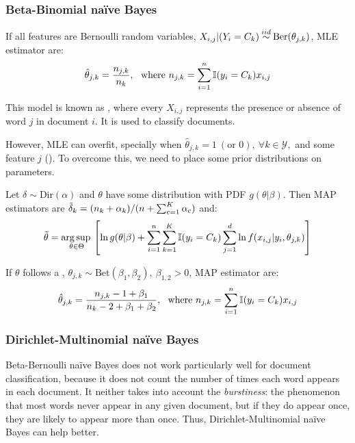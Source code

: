 \subsubsection*{Beta-Binomial naïve Bayes}
If all features are Bernoulli random variables, $X_{i,j}|(Y_i=C_k)\dist{iid}\text{Ber}(\theta_{j,k})$, MLE estimator are:
\begin{equation*}
    \hat{\theta}_{j,k} = \frac{n_{j,k}}{n_k},\ \text{ where } n_{j,k}=\sum_{i=1}^n\operatorname{\mathbb{I}}(y_i=C_k)x_{i,j}
\end{equation*}

This model is known as , where every $X_{i,j}$ represents the presence or absence of word $j$ in document $i$. It is used to classify documents. 

However, MLE can overfit, specially when $\hat{\theta}_{j,k}=1\ (\text{or } 0),\ \forall k\in\mathcal{Y},$ and some feature $j$ (). To overcome this, we need to place some prior distributions on parameters. 

Let $\delta\sim\text{Dir}(\alpha)$ and $\theta$ have some distribution with PDF $g(\theta|\beta)$. Then MAP estimators are $\Tilde{\delta}_k = (n_k+\alpha_k)/(n+\sum_{c=1}^K\alpha_c)$ and:
\begin{equation*}
    \Tilde{\theta} = \operatorname*{arg\,sup\,}_{\theta\in\Theta} \left[\ln g(\theta|\beta)+ \sum_{i=1}^n\sum_{k=1}^K\operatorname{\mathbb{I}}(y_i=C_k)\sum_{j=1}^d\ln f(x_{i,j}|y_i,\theta_{j,k})\right]
\end{equation*}

If $\theta$ follows a , $\theta_{j,k}{\sim}\text{Bet}(\beta_1,\beta_2),\ \beta_{1,2}>0$, MAP estimator are:
\begin{equation*}
    \hat{\theta}_{j,k} = \frac{n_{j,k}-1+\beta_1}{n_k-2+\beta_1+\beta_2},\ \text{ where } n_{j,k}=\sum_{i=1}^n\operatorname{\mathbb{I}}(y_i=C_k)x_{i,j}
\end{equation*}

\subsubsection*{Dirichlet-Multinomial naïve Bayes}
Beta-Bernoulli naïve Bayes does not work particularly well for document classification, because it does not count the number of times each word appears in each document. It neither takes into account the \textit{burstiness}: the phenomenon that most words never appear in any given document, but if they do appear once, they are likely to appear more than once. Thus, Dirichlet-Multinomial naïve Bayes can help better.

